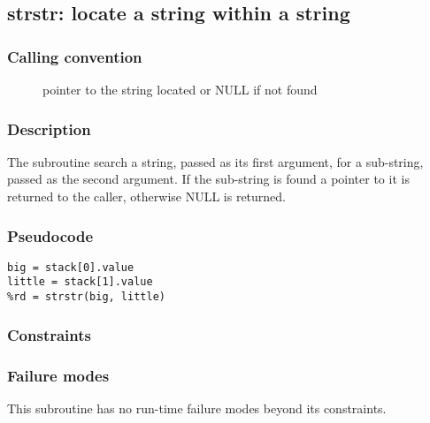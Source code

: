 \clearpage
{}
{}
\label{subr:strstr}
\subsection*{strstr: locate a string within a string}

\subsubsection*{Calling convention}

\begin{description}
\item[] pointer to the string located or NULL if not found
\end{description}

\subsubsection*{Description}

The  subroutine search a string, passed as its first
argument, for a sub-string, passed as the second argument.  If the
sub-string is found a pointer to it is returned to the caller,
otherwise NULL is returned.

\subsubsection*{Pseudocode}

\begin{verbatim}
big = stack[0].value
little = stack[1].value
%rd = strstr(big, little)
\end{verbatim}

\subsubsection*{Constraints}

\subsubsection*{Failure modes}

This subroutine has no run-time failure modes beyond its constraints.
